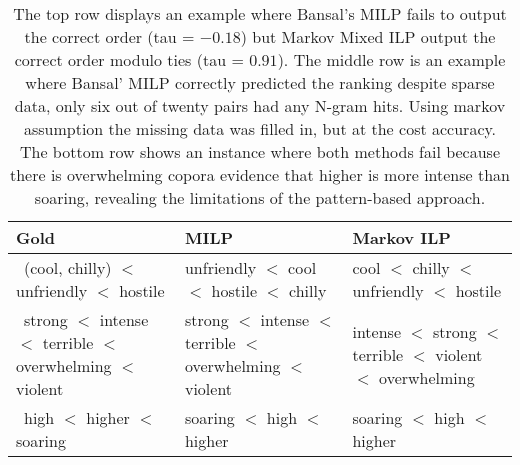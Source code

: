 \begin{table}
\small
\centering
\begin{tabular}{|l|l|l|}
% 
\hline 
\bf Gold & \bf MILP & \bf Markov ILP \\
\hline
% 
\ \pbox{20cm}{(cool, chilly) \\ $<$ unfriendly \\ $<$ hostile } 
& \pbox{20cm}{unfriendly \\ $<$ cool \\ $<$ hostile \\ $<$ chilly }
& \pbox{20cm}{cool \\ $<$ chilly \\ $<$ unfriendly \\ $<$ hostile } \\
% 
\hline
% 
\ \pbox{20cm}{strong \\ $<$ intense \\ $<$ terrible \\ $<$ overwhelming \\ $<$ violent } 
& \pbox{20cm}{strong \\ $<$ intense \\ $<$ terrible \\ $<$ overwhelming \\ $<$ violent }
& \pbox{20cm}{intense \\ $<$ strong \\ $<$ terrible \\ $<$ violent \\ $<$ overwhelming } \\
% 
\hline
% 
\ \pbox{20cm}{high \\ $<$ higher \\ $<$ soaring }
& \pbox{20cm}{soaring \\ $<$ high \\ $<$ higher \\ }
& \pbox{20cm}{soaring \\ $<$ high \\ $<$ higher \\ }\\
% 
\hline
\end{tabular}
\caption{\label{font-table} The top row displays an example where Bansal's MILP fails to output the correct order (tau = $-0.18$) but Markov Mixed ILP output the correct order modulo ties (tau = $0.91$). The middle row is an example where Bansal' MILP correctly predicted the ranking despite sparse data, only six out of twenty pairs had any N-gram hits. Using markov assumption the missing data was filled in, but at the cost accuracy. The bottom row shows an instance where both methods fail because there is overwhelming copora evidence that higher is more intense than soaring, revealing the limitations of the pattern-based approach.}
\end{table}

